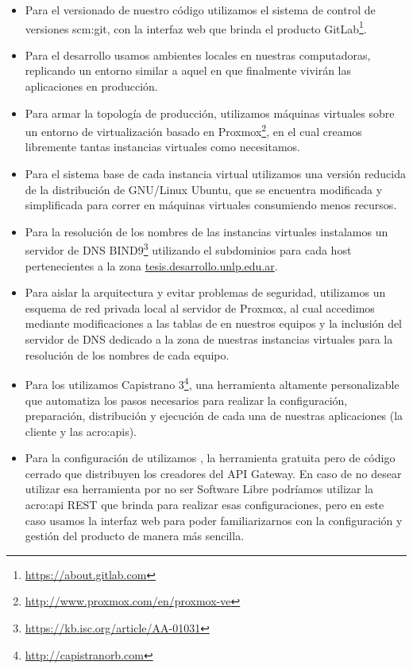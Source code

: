 \begin{itemize}
  \item Para el versionado de nuestro código utilizamos el sistema de control de versiones \gls{scm:git}, con la interfaz web que brinda el producto GitLab\footnote{\url{https://about.gitlab.com}}.

  \item Para el desarrollo usamos ambientes locales en nuestras computadoras, replicando un entorno similar a aquel en que finalmente vivirán las aplicaciones en producción.

  \item Para armar la topología de producción, utilizamos máquinas virtuales sobre un entorno de virtualización basado en Proxmox\footnote{\url{http://www.proxmox.com/en/proxmox-ve}}, en el cual creamos libremente tantas instancias virtuales como necesitamos.

  \item Para el sistema base de cada instancia virtual utilizamos una versión reducida de la distribución de GNU/Linux Ubuntu, que se encuentra modificada y simplificada para correr en máquinas virtuales consumiendo menos recursos.

  \item Para la resolución de los nombres de las instancias virtuales instalamos un servidor de DNS BIND9\footnote{\url{https://kb.isc.org/article/AA-01031}} utilizando el subdominios para cada host pertenecientes a la zona \url{tesis.desarrollo.unlp.edu.ar}.

  \item Para aislar la arquitectura y evitar problemas de seguridad, utilizamos un esquema de red privada local al servidor de Proxmox, al cual accedimos mediante modificaciones a las tablas de  en nuestros equipos y la inclusión del servidor de DNS dedicado a la zona de nuestras instancias virtuales para la resolución de los nombres de cada equipo.

  \item Para los  utilizamos Capistrano 3\footnote{\url{http://capistranorb.com}}, una herramienta altamente personalizable que automatiza los pasos necesarios para realizar la configuración, preparación, distribución y ejecución de cada una de nuestras aplicaciones (la cliente y las \glspl{acro:api}).

  \item Para la configuración de  utilizamos , la herramienta gratuita pero de código cerrado que distribuyen los creadores del API Gateway. En caso de no desear utilizar esa herramienta por no ser Software Libre podríamos utilizar la \gls{acro:api} REST que  brinda para realizar esas configuraciones, pero en este caso usamos la interfaz web para poder familiarizarnos con la configuración y gestión del producto de manera más sencilla.


\end{itemize}
